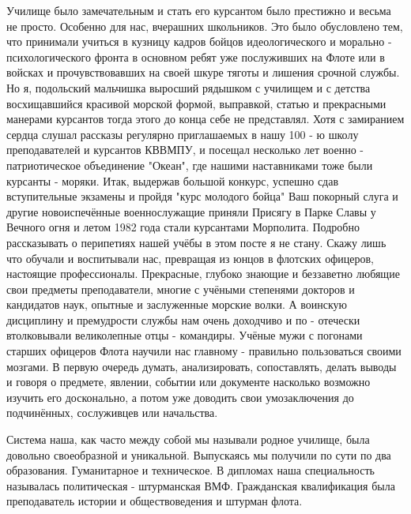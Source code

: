 Училище было замечательным и стать его курсантом было престижно и весьма не
просто. Особенно для нас, вчерашних школьников. Это было обусловлено тем, что
принимали учиться в кузницу кадров бойцов идеологического и морально -
психологического фронта в основном ребят уже послуживших на Флоте или в войсках
и прочувствовавших на своей шкуре тяготы и лишения срочной службы. Но я,
подольский мальчишка выросший рядышком с училищем и с детства восхищавшийся
красивой морской формой, выправкой, статью и прекрасными манерами курсантов
тогда этого до конца себе не представлял. Хотя с замиранием сердца слушал
рассказы регулярно приглашаемых в нашу 100 - ю школу преподавателей и курсантов
КВВМПУ, и посещал несколько лет военно - патриотическое объединение "Океан",
где нашими наставниками тоже были курсанты - моряки. Итак, выдержав большой
конкурс, успешно сдав вступительные экзамены и пройдя "курс молодого бойца" Ваш
покорный слуга и другие новоиспечённые военнослужащие приняли Присягу в Парке
Славы у Вечного огня и летом 1982 года стали курсантами Морполита. Подробно
рассказывать о перипетиях нашей учёбы в этом посте я не стану. Скажу лишь что
обучали и воспитывали нас, превращая из юнцов в флотских офицеров, настоящие
профессионалы. Прекрасные, глубоко знающие и беззаветно любящие свои предметы
преподаватели, многие с учёными степенями докторов и кандидатов наук, опытные и
заслуженные морские волки. А воинскую дисциплину и премудрости службы нам очень
доходчиво и по - отечески втолковывали великолепные отцы - командиры. Учёные
мужи с погонами старших офицеров Флота научили нас главному - правильно
пользоваться своими мозгами. В первую очередь думать, анализировать,
сопоставлять, делать выводы и говоря о предмете, явлении, событии или документе
насколько возможно изучить его досконально, а потом уже доводить свои
умозаключения до подчинённых, сослуживцев или начальства. 

Система наша, как
часто между собой мы называли родное училище, была довольно своеобразной и
уникальной. Выпускаясь мы получили по сути по два образования. Гуманитарное и
техническое. В дипломах наша специальность называлась политическая -
штурманская ВМФ. Гражданская квалификация была преподаватель истории и
обществоведения и штурман флота. 

